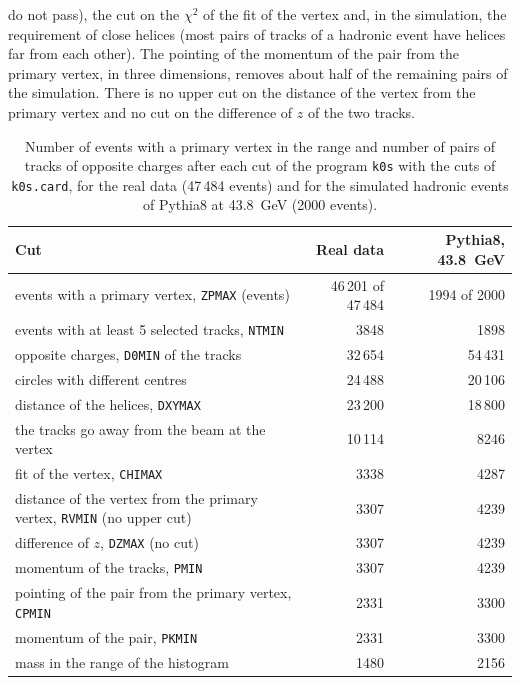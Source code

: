 do not pass), the cut on the $\chi^2$ of the fit of the vertex and, in the simulation, the requirement of close helices (most pairs of tracks of a hadronic event have helices far from each other). The pointing of the momentum of the pair from the primary vertex, in three dimensions, removes about half of the remaining pairs of the simulation. There is no upper cut on the distance of the vertex from the primary vertex and no cut on the difference of $z$ of the two tracks.
\begin{table}[H]\centering
\begin{tabular}{|p{7.6cm}|r|r|}\hline
Cut & Real data & Pythia8, 43.8~GeV \\\hline\hline
events with a primary vertex, \texttt{ZPMAX} (events) & 46\,201 of 47\,484 & 1994 of 2000 \\
events with at least 5 selected tracks, \texttt{NTMIN} & 3848 & 1898 \\\hline
opposite charges, \texttt{D0MIN} of the tracks & 32\,654 & 54\,431 \\
circles with different centres & 24\,488 & 20\,106 \\
distance of the helices, \texttt{DXYMAX} & 23\,200 & 18\,800 \\
the tracks go away from the beam at the vertex & 10\,114 & 8246 \\
fit of the vertex, \texttt{CHIMAX} & 3338 & 4287 \\
distance of the vertex from the primary vertex, \texttt{RVMIN} (no upper cut) & 3307 & 4239 \\
difference of $z$, \texttt{DZMAX} (no cut) & 3307 & 4239 \\
momentum of the tracks, \texttt{PMIN} & 3307 & 4239 \\
pointing of the pair from the primary vertex, \texttt{CPMIN} & 2331 & 3300 \\
momentum of the pair, \texttt{PKMIN} & 2331 & 3300 \\
mass in the range of the histogram & 1480 & 2156 \\\hline
\end{tabular}
\caption{Number of events with a primary vertex in the range and number of pairs of tracks of opposite charges after each cut of the program \texttt{k0s} with the cuts of \texttt{k0s.card}, for the real data (47\,484 events) and for the simulated hadronic events of Pythia8 at 43.8~GeV (2000 events).}
\label{tab:k0sflow}
\end{table}

